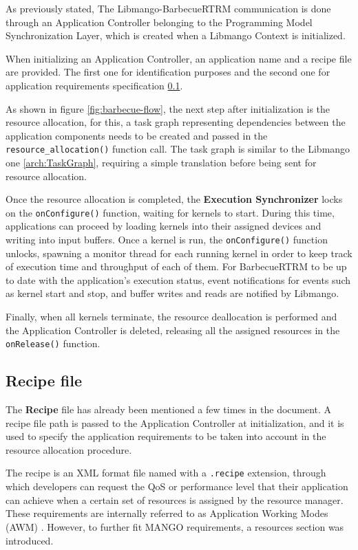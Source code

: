 As previously stated, The Libmango-BarbecueRTRM communication is done through an Application Controller belonging to the Programming Model Synchronization Layer, which is created when a Libmango Context is initialized.

When initializing an Application Controller, an application name and a recipe file are provided. The first one for identification purposes and the second one for application requirements specification \ref{bbque:recipe}.

As shown in figure \ref{fig:barbecue-flow}, the next step after initialization is the resource allocation, for this, a task graph representing dependencies between the application components needs to be created and passed in the \texttt{resource\_allocation()} function call. The task graph is similar to the Libmango one \ref{arch:TaskGraph}, requiring a simple translation before being sent for resource allocation. 

Once the resource allocation is completed, the \textbf{Execution Synchronizer} locks on the \texttt{onConfigure()} function, waiting for kernels to start. During this time, applications can proceed by loading kernels into their assigned devices and writing into input buffers. Once a kernel is run, the \texttt{onConfigure()} function unlocks, spawning a monitor thread for each running kernel in order to keep track of execution time and throughput of each of them. 
For BarbecueRTRM to be up to date with the application's execution status, event notifications for events such as kernel start and stop, and buffer writes and reads are notified by Libmango.

Finally, when all kernels terminate, the resource deallocation is performed and the Application Controller is deleted, releasing all the assigned resources in the \linebreak \texttt{onRelease()} function.

\subsection{Recipe file} \label{bbque:recipe}

The \textbf{Recipe} file has already been mentioned a few times in the document. A recipe file path is passed to the Application Controller at initialization, and it is used to specify the application requirements to be taken into account in the resource allocation procedure.

The recipe is an XML \cite{xml} format file named with a \texttt{.recipe} extension, through which developers can request the QoS or performance level that their application can achieve when a certain set of resources is assigned by the resource manager. These requirements are internally referred to as Application Working Modes (AWM) \cite{mango_exploring_manycore_architectures}. However, to further fit MANGO requirements, a resources section was introduced.

